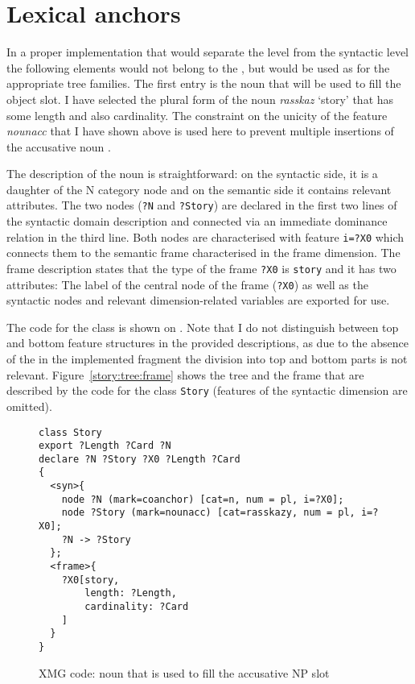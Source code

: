 \section{Lexical anchors}\largerpage[-1]
In a proper implementation that would separate the  level from the syntactic level the following elements would not belong to the , but would be used as  for the appropriate tree families. The first entry is the noun that will be used to fill the object slot. I have selected the plural form of the noun \textit{rasskaz} `story' that has some length and also cardinality. The constraint on the unicity of the feature \textit{nounacc} that I have shown above is used here to prevent multiple insertions of the accusative noun .

The description of the noun is straightforward: on the syntactic side, it is a daughter of the N category node and on the semantic side it contains relevant attributes. The two nodes (\texttt{?N} and \texttt{?Story}) are declared in the first two lines of the syntactic domain description and connected via an immediate dominance relation in the third line. Both nodes are characterised with feature \texttt{i=?X0} which connects them to the semantic frame characterised in the frame dimension. The frame description states that the type of the frame \texttt{?X0} is \texttt{story} and it has two attributes: The label of the central node of the frame (\texttt{?X0}) as well as the syntactic nodes and relevant dimension-related variables are exported for  use. 

The code for the class is shown on . Note that I do not distinguish between top and bottom feature structures in the provided descriptions, as due to the absence of the  in the implemented fragment the division into top and bottom parts is not relevant. Figure~\ref{story:tree:frame} shows the tree and the frame that are described by the code for the class \texttt{Story} (features of the syntactic dimension are omitted).

\begin{figure}
\begin{lstlisting}[style=xmg]
class Story
export ?Length ?Card ?N
declare ?N ?Story ?X0 ?Length ?Card
{
  <syn>{
    node ?N (mark=coanchor) [cat=n, num = pl, i=?X0];
    node ?Story (mark=nounacc) [cat=rasskazy, num = pl, i=?X0];
    ?N -> ?Story
  };
  <frame>{
    ?X0[story,
        length: ?Length,
        cardinality: ?Card
    ]
  }
}
\end{lstlisting}
\caption{XMG code: noun that is used to fill the accusative NP slot \label{xmg:noun}}
\end{figure}


